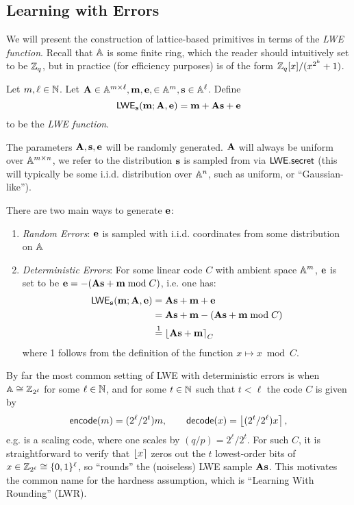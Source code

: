 \subsection{Learning with Errors}\label{ssec: LWE}
We will present the construction of lattice-based primitives in terms of the \emph{LWE function}.
Recall that $\mathbb{A}$ is some finite ring, which the reader should intuitively set to be $\mathbb{Z}_q$, but in practice (for efficiency purposes) is of the form $\mathbb{Z}_q[x] / (x^{2^k}+1)$.
\begin{definition}
	Let $m,\ell\in\mathbb{N}$.
	Let $\mathbf{A}\in\mathbb{A}^{m\times \ell}, \mathbf{m},\mathbf{e}, \in\mathbb{A}^m, \mathbf{s}\in\mathbb{A}^\ell$.
	Define
	\begin{equation*}
	\mathsf{LWE}_{\mathbf{s}}(\mathbf{m};\mathbf{A}, \mathbf{e}) = \mathbf{m} + \mathbf{A}\mathbf{s} + \mathbf{e}
	\end{equation*}
	to be the \emph{LWE function}.
\end{definition}
The parameters $\mathbf{A}, \mathbf{s}, \mathbf{e}$ will be randomly generated.
$\mathbf{A}$ will always be uniform over $\mathbb{A}^{m\times n}$, we refer to the distribution $\mathbf{s}$ is sampled from via $\mathsf{LWE}.\mathsf{secret}$ (this will typically be some i.i.d. distribution over $\mathbb{A}^n$, such as uniform, or ``Gaussian-like'').


There are two main ways to generate $\mathbf{e}$:
\begin{enumerate}
	\item \emph{Random Errors}: $\mathbf{e}$ is sampled with i.i.d. coordinates from some distribution on $\mathbb{A}$
	\item \emph{Deterministic Errors}: For some linear code $C$ with ambient space $\mathbb{A}^m$, $\mathbf{e}$ is set to be $\mathbf{e} =-(\mathbf{A}\mathbf{s} + \mathbf{m}\bmod C)$, i.e. one has:
	\begin{align*}
	\mathsf{LWE}_{\mathbf{s}}(\mathbf{m}; \mathbf{A}, \mathbf{e}) &= \mathbf{A}\mathbf{s} + \mathbf{m}+\mathbf{e} \\
	&=\mathbf{A}\mathbf{s} + \mathbf{m} - (\mathbf{A}\mathbf{s} + \mathbf{m}\bmod C)\\
	&\stackrel{1}{=} \left\lfloor\mathbf{A}\mathbf{s} + \mathbf{m}\right\rceil_C
	\end{align*}
	where 1 follows from the definition of the function $x\mapsto x\bmod C$.
\end{enumerate}
By far the most common setting of LWE with deterministic errors is when $\mathbb{A}\cong \mathbb{Z}_{2^\ell}$ for some $\ell\in\mathbb{N}$, and for some $t\in \mathbb{N}$ such that $t< \ell$ the code $C$ is given by
\begin{equation*}
\mathsf{encode}(m) = (2^\ell / 2^t)m,\qquad \mathsf{decode}(x) = \left\lfloor(2^t/2^\ell)x\right\rceil,
\end{equation*}
e.g. is a scaling code, where one scales by $(q/p) = 2^\ell/2^t$.
For such $C$, it is straightforward to verify that $\left\lfloor x\right\rceil$ zeros out the $t$ lowest-order bits of $x\in\mathbb{Z}_{2^\ell}\cong \{0,1\}^\ell$, so ``rounds'' the (noiseless) LWE sample $\mathbf{A}\mathbf{s}$.
This motivates the common name for the hardness assumption, which is ``Learning With Rounding'' (LWR).


